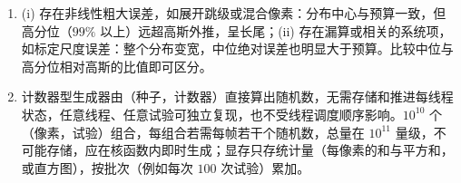 \begin{enumerate}
  \item (i) 存在非线性粗大误差，如展开跳级或混合像素：分布中心与预算一致，但高分位（$99\%$ 以上）远超高斯外推，呈长尾；(ii) 存在漏算或相关的系统项，如标定尺度误差：整个分布变宽，中位绝对误差也明显大于预算。比较中位与高分位相对高斯的比值即可区分。
  \item 计数器型生成器由（种子，计数器）直接算出随机数，无需存储和推进每线程状态，任意线程、任意试验可独立复现，也不受线程调度顺序影响。$10^{10}$ 个（像素，试验）组合，每组合若需每帧若干个随机数，总量在 $10^{11}$ 量级，不可能存储，应在核函数内即时生成；显存只存统计量（每像素的和与平方和，或直方图），按批次（例如每次 $100$ 次试验）累加。
\end{enumerate}
